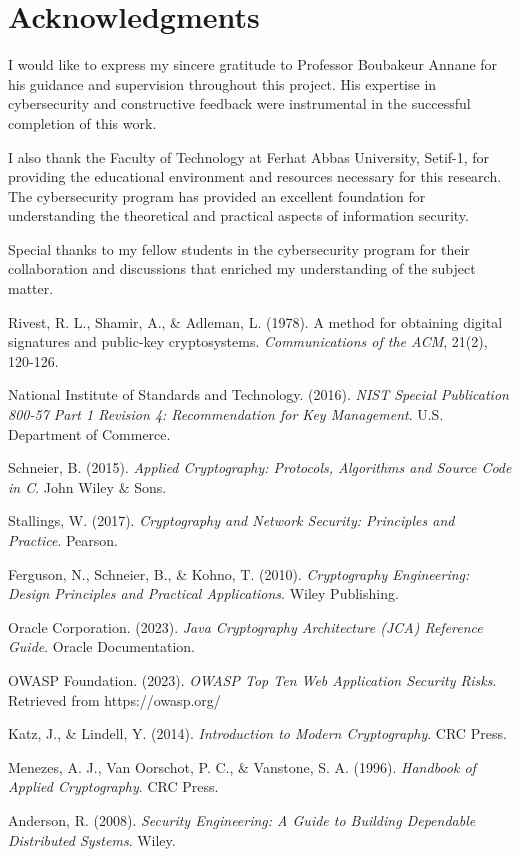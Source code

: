 \documentclass[12pt,a4paper]{article}
\begin{document}
\section*{Acknowledgments}

I would like to express my sincere gratitude to Professor Boubakeur Annane for his guidance and supervision throughout this project. His expertise in cybersecurity and constructive feedback were instrumental in the successful completion of this work.

I also thank the Faculty of Technology at Ferhat Abbas University, Setif-1, for providing the educational environment and resources necessary for this research. The cybersecurity program has provided an excellent foundation for understanding the theoretical and practical aspects of information security.

Special thanks to my fellow students in the cybersecurity program for their collaboration and discussions that enriched my understanding of the subject matter.

\newpage

\begin{thebibliography}{99}

Rivest, R. L., Shamir, A., \& Adleman, L. (1978). A method for obtaining digital signatures and public-key cryptosystems. \textit{Communications of the ACM}, 21(2), 120-126.

National Institute of Standards and Technology. (2016). \textit{NIST Special Publication 800-57 Part 1 Revision 4: Recommendation for Key Management}. U.S. Department of Commerce.

Schneier, B. (2015). \textit{Applied Cryptography: Protocols, Algorithms and Source Code in C}. John Wiley \& Sons.

Stallings, W. (2017). \textit{Cryptography and Network Security: Principles and Practice}. Pearson.

Ferguson, N., Schneier, B., \& Kohno, T. (2010). \textit{Cryptography Engineering: Design Principles and Practical Applications}. Wiley Publishing.

Oracle Corporation. (2023). \textit{Java Cryptography Architecture (JCA) Reference Guide}. Oracle Documentation.

OWASP Foundation. (2023). \textit{OWASP Top Ten Web Application Security Risks}. Retrieved from https://owasp.org/

Katz, J., \& Lindell, Y. (2014). \textit{Introduction to Modern Cryptography}. CRC Press.

Menezes, A. J., Van Oorschot, P. C., \& Vanstone, S. A. (1996). \textit{Handbook of Applied Cryptography}. CRC Press.

Anderson, R. (2008). \textit{Security Engineering: A Guide to Building Dependable Distributed Systems}. Wiley.

\end{thebibliography}
\end{document}
